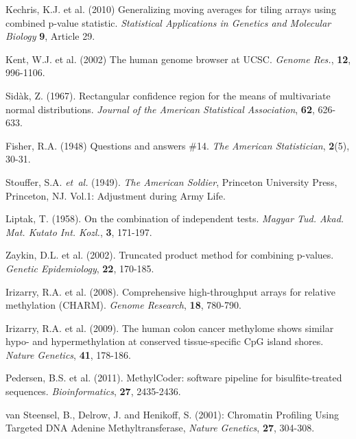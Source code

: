 \documentclass{bioinfo}
\begin{document}
\begin{thebibliography}{}

Kechris, K.J. et al. (2010)
Generalizing moving averages for tiling arrays using combined p-value
statistic. {\it Statistical Applications in Genetics and Molecular Biology}
{\bf 9}, Article 29.

 Kent, W.J. et al. (2002) The human genome browser at UCSC. {\it 
Genome Res.}, {\bf 12}, 996-1106.

Sidàk, Z. (1967).
Rectangular confidence region for the means of multivariate normal distributions.
\textit{Journal of the American Statistical Association}, {\bf 62}, 626-633.

Fisher, R.A. (1948)
Questions and answers \#14.
{\it The American Statistician}, {\bf 2}(5), 30-31.

Stouffer, S.A. \textit{et~al.} (1949). \textit{The American Soldier},
Princeton University Press, Princeton, NJ. Vol.1: Adjustment during Army Life.

Liptak, T. (1958). On the combination of independent tests. {\it Magyar Tud.
Akad. Mat. Kutato Int. Kozl.}, {\bf 3}, 171-197.

 Zaykin, D.L. et al. (2002).
Truncated product method for combining p-values. {\it Genetic Epidemiology},
{\bf 22}, 170-185.

 Irizarry, R.A. et al.
(2008). Comprehensive high-throughput arrays for relative methylation (CHARM).
{\it Genome Research}, {\bf 18}, 780-790.

 Irizarry, R.A. et al.
(2009). The human colon cancer methylome shows similar hypo- and
hypermethylation at conserved tissue-specific CpG island shores.
{\it Nature Genetics}, {\bf 41}, 178-186.

 Pedersen, B.S. et al.
(2011). MethylCoder: software pipeline for bisulfite-treated sequences.
{\it Bioinformatics}, {\bf 27}, 2435-2436.

van Steensel, B., Delrow, J. and Henikoff, S. (2001):
Chromatin Profiling Using Targeted DNA Adenine Methyltransferase,
{\it Nature Genetics}, {\bf 27}, 304-308.


\end{thebibliography}
\end{document}
